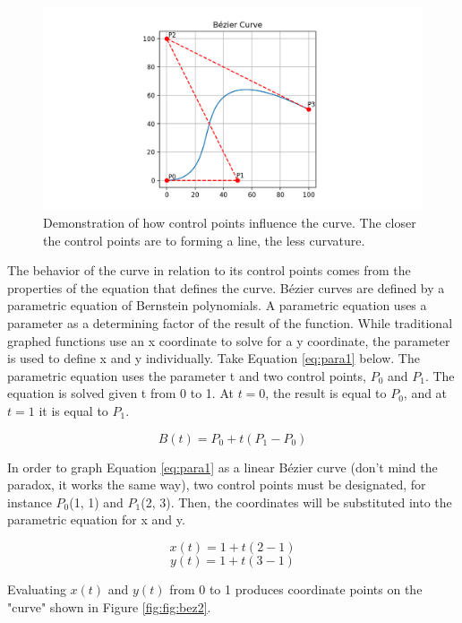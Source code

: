 \documentclass[12pt,letterpaper]{article}
\begin{document}
\begin{figure}[H]
    \includegraphics[width=15cm]{Figure_2}
    \centering
    \caption{Demonstration of how control points influence the curve. The closer the control points are to forming a line, the less curvature.}
\end{figure}

The behavior of the curve in relation to its control points comes from the properties of the equation that defines the curve. B\'ezier curves are defined by a parametric equation of Bernstein polynomials. A parametric equation uses a parameter as a determining factor of the result of the function. While traditional graphed functions use an x coordinate to solve for a y coordinate, the parameter is used to define x and y individually. 
Take Equation \ref{eq:para1} below. The parametric equation uses the parameter t and two control points, $P_0$ and $P_1$. The equation is solved given t from 0 to 1. At $t=0$, the result is equal to $P_0$, and at $t=1$ it is equal to $P_1$.

\begin{equation}
    \label{eq:para1}
    B(t) = P_0 + t(P_1 - P_0)
\end{equation}

In order to graph Equation \ref{eq:para1} as a linear B\'ezier curve (don’t mind the paradox, it works the same way), two control points must be designated, for instance $P_0$(1, 1) and $P_1$(2, 3). Then, the coordinates will be substituted into the parametric equation for x and y.

$$x(t) = 1 + t(2-1)$$
$$y(t) = 1 + t(3-1)$$

Evaluating $x(t)$ and $y(t)$ from 0 to 1 produces coordinate points on the "curve" shown in Figure \ref{fig:fig:bez2}. 
\end{document}
